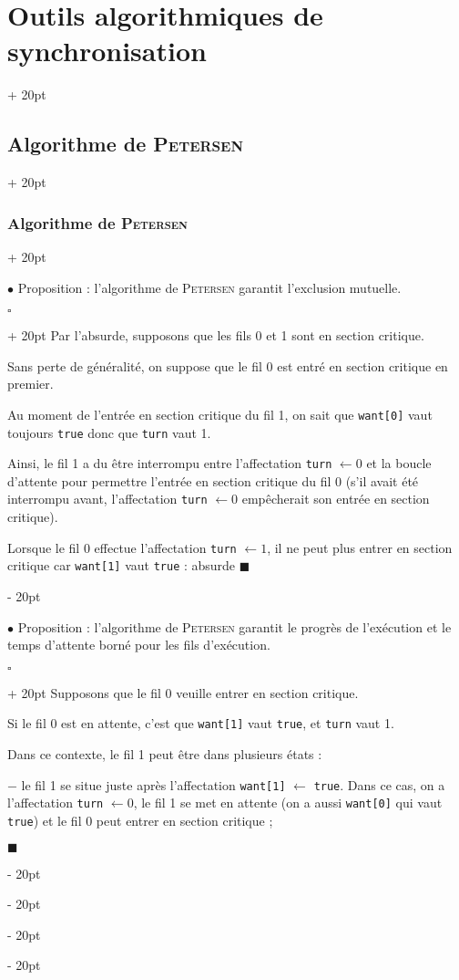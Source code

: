 \documentclass[a4paper, 12pt, twoside]{article}
\newcommand{\ind}[1][20pt]{\advance\leftskip + #1}
\newcommand{\deind}[1][20pt]{\advance\leftskip - #1}
\newenvironment{indt}[2][20pt]{#2 \par \ind[#1]}{\par \deind} %
\newenvironment{proof}[1][{}]{\begin{indt}{$\square$ #1}}{$\blacksquare$ \end{indt}}
\begin{document}
\begin{indt}{\section{Outils algorithmiques de synchronisation}}
\begin{indt}{\subsection{Algorithme de \textsc{Petersen}}}
\begin{indt}{\subsubsection{Algorithme de \textsc{Petersen}}}
                \vspace{12pt}
                
                $\bullet$ Proposition : l'algorithme de \textsc{Petersen} garantit l'exclusion mutuelle.

                \begin{proof}
                    Par l'absurde, supposons que les fils 0 et 1 sont en section critique.

                    Sans perte de généralité, on suppose que le fil 0 est entré en section critique en premier.

                    Au moment de l'entrée en section critique du fil 1, on sait que \texttt{want[0]} vaut toujours \texttt{true} donc que \texttt{turn} vaut 1.

                    Ainsi, le fil 1 a du être interrompu entre l'affectation \texttt{turn} $\leftarrow 0$ et la boucle d'attente pour permettre l'entrée en section critique du fil 0 (s'il avait été interrompu avant, l'affectation \texttt{turn} $\leftarrow 0$ empêcherait son entrée en section critique).

                    Lorsque le fil 0 effectue l'affectation \texttt{turn} $\leftarrow 1$, il ne peut plus entrer en section critique car \texttt{want[1]} vaut \texttt{true} : absurde
                \end{proof}

                \vspace{12pt}
                
                $\bullet$ Proposition : l'algorithme de \textsc{Petersen} garantit le progrès de l'exécution et le temps d'attente borné pour les fils d'exécution.

                \begin{proof}
                    Supposons que le fil 0 veuille entrer en section critique.

                    Si le fil 0 est en attente, c'est que \texttt{want[1]} vaut \texttt{true}, et \texttt{turn} vaut 1.

                    Dans ce contexte, le fil 1 peut être dans plusieurs états :

                    $-$ le fil 1 se situe juste après l'affectation \texttt{want[1]} $\leftarrow$ \texttt{true}. Dans ce cas, on a l'affectation \texttt{turn} $\leftarrow 0$, le fil 1 se met en attente (on a aussi \texttt{want[0]} qui vaut \texttt{true}) et le fil 0 peut entrer en section critique ;


\end{proof}
\end{indt}
\end{indt}
\end{indt}
\end{document}
